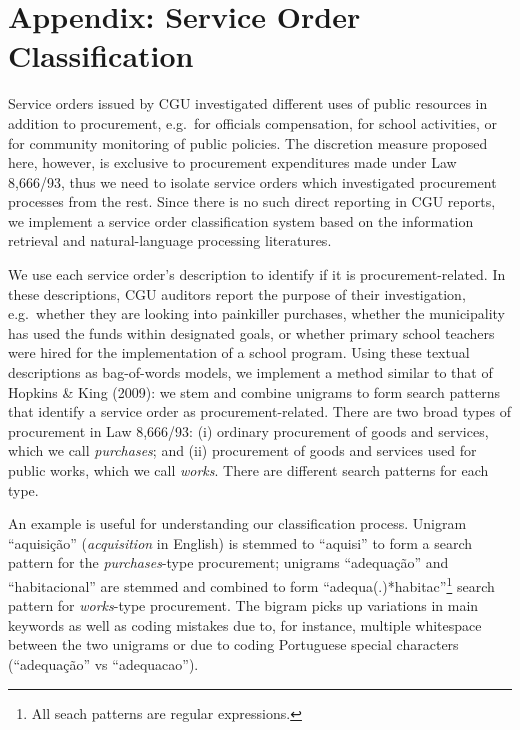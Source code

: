 \documentclass[]{article}
\title{}
\author{}
\date{}
\let\rmarkdownfootnote\footnote%
\def\footnote{\protect\rmarkdownfootnote}
\theoremstyle{definition}
\theoremstyle{definition}
\theoremstyle{definition}
\theoremstyle{remark}
\begin{document}
\hypertarget{appendix-appendix}{%
\appendix}


\hypertarget{appendixA}{%
\section{Appendix: Service Order Classification}\label{appendixA}}

Service orders issued by CGU investigated different uses of public
resources in addition to procurement, e.g.~for officials compensation,
for school activities, or for community monitoring of public policies.
The discretion measure proposed here, however, is exclusive to
procurement expenditures made under Law 8,666/93, thus we need to
isolate service orders which investigated procurement processes from the
rest. Since there is no such direct reporting in CGU reports, we
implement a service order classification system based on the information
retrieval and natural-language processing literatures.

We use each service order's description to identify if it is
procurement-related. In these descriptions, CGU auditors report the
purpose of their investigation, e.g.~whether they are looking into
painkiller purchases, whether the municipality has used the funds within
designated goals, or whether primary school teachers were hired for the
implementation of a school program. Using these textual descriptions as
bag-of-words models, we implement a method similar to that of Hopkins \&
King (2009): we stem and combine unigrams to form search patterns that
identify a service order as procurement-related. There are two broad
types of procurement in Law 8,666/93: (i) ordinary procurement of goods
and services, which we call \emph{purchases}; and (ii) procurement of
goods and services used for public works, which we call \emph{works}.
There are different search patterns for each type.

An example is useful for understanding our classification process.
Unigram ``aquisição'' (\emph{acquisition} in English) is stemmed to
``aquisi'' to form a search pattern for the \emph{purchases}-type
procurement; unigrams ``adequação'' and ``habitacional'' are stemmed and
combined to form ``adequa(.)*habitac''\footnote{All seach patterns are
  regular expressions.} search pattern for \emph{works}-type
procurement. The bigram picks up variations in main keywords as well as
coding mistakes due to, for instance, multiple whitespace between the
two unigrams or due to coding Portuguese special characters
(``adequação'' vs ``adequacao'').
\end{document}
